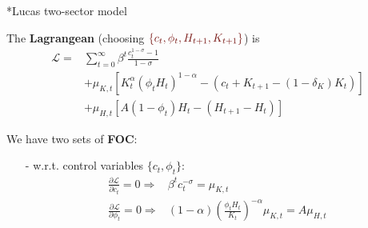 \documentclass[10pt,landscape,a4paper]{article}
\makeatletter
\renewcommand{\subsection}{\@startsection{subsection}{1}{0mm}{.2ex}{.2ex}{\bfseries}}
\makeatother
\begin{document}
\begin{multicols*}{4}
\newpage
\subsection*{Lucas two-sector model}
\vspace{2pt}

\vspace{2pt}
The \textbf{Lagrangean} (choosing ${\color{myred}\left\{c_t,\phi_t,H_{t+1},K_{t+1}\right\}}$) is
\begin{align*}
    \mathcal{L} = &\sum^{\infty}_{t=0}\beta^t\frac{c_t^{1-\sigma}-1}{1-\sigma} \\
    &+\mu_{K,t}\left[ K_t^{\alpha}\left(\phi_t H_t \right)^{1-\alpha}-\left(c_t+K_{t+1}-\left(1-\delta_K\right)K_t\right) \right]\\
    & + \mu_{H,t}\left[A\left(1-\phi_t\right)H_t-\left(H_{t+1}-H_t\right) \right]
\end{align*}

We have two sets of \textbf{FOC}:

\begin{itemize}
    \item[-] w.r.t. control variables $\{c_t,\phi_t\}$:
    \begin{align*}
        \frac{\partial \mathcal{L}}{\partial c_t}=0 \Rightarrow & \beta^t c_t^{-\sigma}=\mu_{K,t}\\
        \frac{\partial \mathcal{L}}{\partial \phi_t}=0 \Rightarrow& (1-\alpha)\left(\frac{\phi_t H_t}{K_t}\right)^{-\alpha}\mu_{K,t}=A\mu_{H,t}
    \end{align*}
    

\end{itemize}
\end{multicols*}
\end{document}
